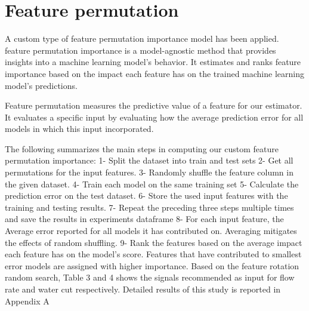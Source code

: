 \section{Feature permutation}
A custom type of feature permutation importance model has been applied. feature permutation importance is a model-agnostic method that provides insights into a machine learning model’s behavior. It estimates and ranks feature importance based on the impact each feature has on the trained machine learning model’s predictions.

Feature permutation measures the predictive value of a feature for our estimator. It evaluates a specific input by evaluating how the average prediction error for all models in which this input incorporated. 

The following summarizes the main steps in computing our custom feature permutation importance:
1-	Split the dataset into train and test sets
2-	Get all permutations for the input features.
3-	Randomly shuffle the feature column in the given dataset.
4-	Train each model on the same training set
5-	Calculate the prediction error on the test dataset. 
6-	Store the used input features with the training and testing results.
7-	Repeat the preceding three steps multiple times and save the results in experiments dataframe
8-	For each input feature, the Average error reported for all models it has contributed on. Averaging mitigates the effects of random shuffling.
9-	Rank the features based on the average impact each feature has on the model’s score. Features that have contributed to smallest error models are assigned with higher importance. 
Based on the feature rotation random search, Table 3 and 4 shows the signals recommended as input for flow rate and water cut respectively. Detailed results of this study is reported in Appendix A


